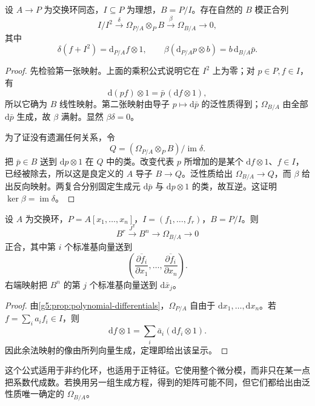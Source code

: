 \begin{theorem}[余法正合列]\label{g5:thm:conormal-sequence}
	设 \(A\to P\) 为交换环同态，\(I\subseteq P\) 为理想，\(B=P/I\)。存在自然的 \(B\) 模正合列
	\[
		I/I^2\xrightarrow{\delta}
		\Omega_{P/A}\otimes_P B\xrightarrow{\beta}
		\Omega_{B/A}\longrightarrow0,
	\]
	其中
	\[
		\delta(f+I^2)=\mathrm{d}_{P/A}f\otimes1,\qquad
		\beta(\mathrm{d}_{P/A}p\otimes b)=b\,\mathrm{d}_{B/A}\bar p.
	\]
\end{theorem}
\begin{proof}
	先检验第一张映射。上面的乘积公式说明它在 \(I^2\) 上为零；对 \(p\in P,f\in I\)，有
	\[
		\mathrm{d}(pf)\otimes1
		=\bar p\,(\mathrm{d}f\otimes1),
	\]
	所以它确为 \(B\) 线性映射。第二张映射由导子 \(p\mapsto\mathrm{d}\bar p\) 的泛性质得到；\(\Omega_{B/A}\) 由全部 \(\mathrm{d}\bar p\) 生成，故 \(\beta\) 满射。显然 \(\beta\delta=0\)。

	为了证没有遗漏任何关系，令
	\[
		Q=(\Omega_{P/A}\otimes_P B)/\operatorname{im}\delta.
	\]
	把 \(\bar p\in B\) 送到 \(\mathrm{d}p\otimes1\) 在 \(Q\) 中的类。改变代表 \(p\) 所增加的是某个 \(\mathrm{d}f\otimes1\)、\(f\in I\)，已经被除去，所以这是良定义的 \(A\) 导子 \(B\to Q\)。泛性质给出 \(\Omega_{B/A}\to Q\)，而 \(\beta\) 给出反向映射。两复合分别固定生成元 \(\mathrm{d}\bar p\) 与 \(\mathrm{d}p\otimes1\) 的类，故互逆。这证明 \(\ker\beta=\operatorname{im}\delta\)。
\end{proof}

\begin{corollary}\label{g5:cor:differentials-presentation}
	设 \(A\) 为交换环，\(P=A[x_1,\ldots,x_n]\)，\(I=(f_1,\ldots,f_r)\)，\(B=P/I\)。则
	\[
		B^r\xrightarrow{J^{\mathsf T}}B^n
		\longrightarrow\Omega_{B/A}\longrightarrow0
	\]
	正合，其中第 \(i\) 个标准基向量送到
	\[
		\left(\overline{\frac{\partial f_i}{\partial x_1}},
		\ldots,\overline{\frac{\partial f_i}{\partial x_n}}\right).
	\]
	右端映射把 \(B^n\) 的第 \(j\) 个标准基向量送到 \(\mathrm{d}\bar x_j\)。
\end{corollary}
\begin{proof}
	由\cref{g5:prop:polynomial-differentials}，\(\Omega_{P/A}\) 自由于 \(\mathrm{d}x_1,\ldots,\mathrm{d}x_n\)。若 \(f=\sum_i a_if_i\in I\)，则
	\[
		\mathrm{d}f\otimes1=\sum_i\bar a_i(\mathrm{d}f_i\otimes1).
	\]
	因此余法映射的像由所列向量生成，定理即给出该呈示。
\end{proof}

这个公式适用于非约化环，也适用于正特征。它使用整个微分模，而非只在某一点把系数代成数。若换用另一组生成方程，得到的矩阵可能不同，但它们都给出由泛性质唯一确定的 \(\Omega_{B/A}\)。

